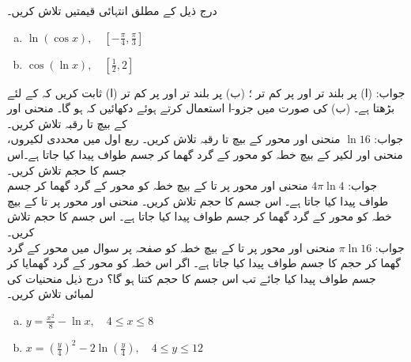 درج ذیل کے مطلق انتہائی قیمتیں تلاش کریں۔
\begin{multicols}{2}
\begin{enumerate}[a.]
\item
$\ln(\cos x),\quad [-\tfrac{\pi}{4},\tfrac{\pi}{3}]$
\item
$\cos(\ln x),\quad [\tfrac{1}{2},2]$
\end{enumerate}
\end{multicols}
جواب:\quad
  (ا) پر بلند تر  اور   پر کم تر ؛ (ب)  پر بلند تر  اور  پر کم تر 
(ا) ثابت کریں کہ  کے لئے  بڑھتا ہے۔ (ب)  کی صورت میں جزو-ا استعمال کرتے ہوئے دکھائیں کہ  ہو گا۔
منحنی  اور  کے بیچ  تا  رقبہ تلاش کریں۔\\
جواب:\quad
$\ln 16$
منحنی  اور محور  کے بیچ  تا  رقبہ تلاش کریں۔
ربع اول میں محددی لکیروں، منحنی  اور لکیر  کے بیچ خطہ کو محور  کے گرد گھما کر جسم طواف پیدا کیا جاتا ہے۔اس جسم کا حجم تلاش کریں۔\\
جواب:\quad
$4\pi\ln 4$
منحنی  اور محور  پر  تا  کے بیچ خطہ کو محور  کے گرد گھما کر جسم طواف پیدا کیا جاتا ہے۔ اس جسم کا حجم تلاش کریں۔
منحنی  اور محور  پر  تا  کے بیچ خطہ کو محور  کے گرد گھما کر جسم طواف پیدا کیا جاتا ہے۔ اس جسم کا حجم تلاش کریں۔\\
جواب:\quad
$\pi \ln 16$
منحنی  اور محور  پر  تا  کے بیچ خطہ  کو صفحہ  پر سوال   میں محور  کے گرد گھما کر  حجم کا جسم طواف پیدا کیا جاتا ہے۔ اگر اس خطہ کو محور  کے گرد گھمایا کر جسم طواف پیدا کیا جائے تب اس جسم کا حجم کتنا ہو گا؟
درج ذیل منحنیات کی لمبائی تلاش کریں۔
\begin{multicols}{2}
\begin{enumerate}[a.]
\item
$y=\tfrac{x^2}{8}-\ln x,\quad 4\le x\le 8$
\item
$x=(\tfrac{y}{4})^2-2\ln(\tfrac{y}{4}),\quad 4\le y\le 12$
\end{enumerate}
\end{multicols}
